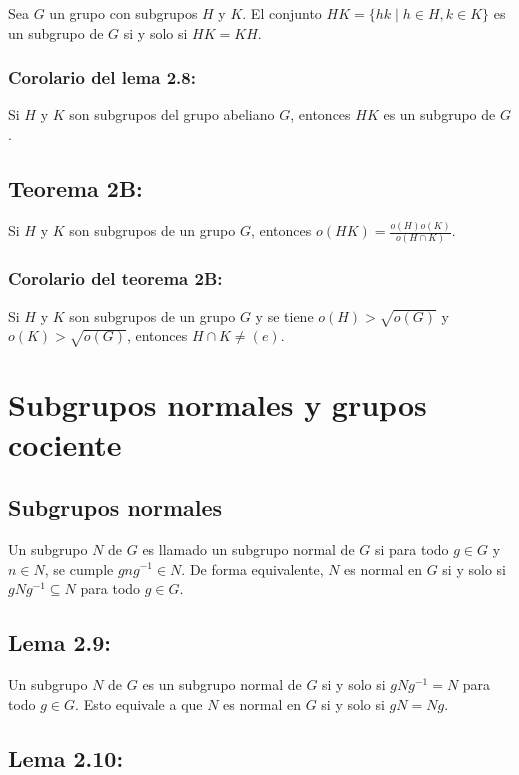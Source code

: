 \documentclass{article}
\begin{document}
Sea $G$ un grupo con subgrupos $H$ y $K$. El conjunto $HK=\{hk\mid h\in H, k\in K\}$ es un subgrupo de $G$ si y solo si $HK=KH$.

\subsubsection*{\color{blue} Corolario del lema 2.8:}

Si $H$ y $K$ son subgrupos del grupo abeliano $G$, entonces $HK$ es un subgrupo de $G$.

\subsection*{\color{red} Teorema 2B:}

Si $H$ y $K$ son subgrupos de un grupo $G$, entonces $o(HK)=\displaystyle\frac{o(H)o(K)}{o(H\cap K)}$.

\subsubsection*{\color{red} Corolario del teorema 2B:}

Si $H$ y $K$ son subgrupos de un grupo $G$ y se tiene $o(H)>\sqrt{o(G)}$ y $o(K)>\sqrt{o(G)}$, entonces $H\cap K\neq (e)$.

\newpage
\section{Subgrupos normales y grupos cociente}

\subsection*{\color{violet} Subgrupos normales}

Un subgrupo $N$ de $G$ es llamado un subgrupo normal de $G$ si para todo $g\in G$ y $n\in N$, se cumple $gng^{-1}\in N$. De forma equivalente, $N$ es normal en $G$ si y solo si $gNg^{-1}\subseteq N$ para todo $g\in G$.

\subsection*{\color{blue} Lema 2.9:}

Un subgrupo $N$ de $G$ es un subgrupo normal de $G$ si y solo si $gNg^{-1}=N$ para todo $g\in G$. Esto equivale a que $N$ es normal en $G$ si y solo si $gN=Ng$. 

\subsection*{\color{blue} Lema 2.10:}
\end{document}
